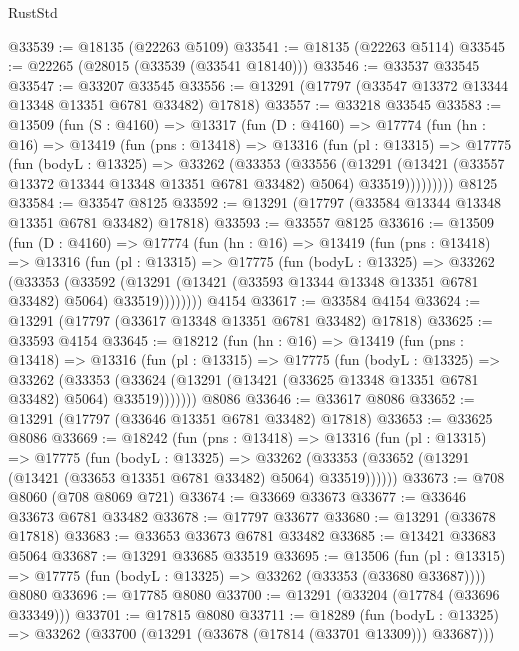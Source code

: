 \begin{lexlean}{RustStd}
\begin{coremodule}
@33539 := @18135 (@22263 @5109)
@33541 := @18135 (@22263 @5114)
@33545 := @22265 (@28015 (@33539 (@33541 @18140)))
@33546 := @33537 @33545
@33547 := @33207 @33545
@33556 := @13291 (@17797 (@33547 @13372 @13344 @13348 @13351 @6781 @33482) @17818)
@33557 := @33218 @33545
@33583 := @13509
    (fun (S : @4160) =>
    @13317
      (fun (D : @4160) =>
      @17774
        (fun (hn : @16) =>
        @13419
          (fun (pns : @13418) =>
          @13316
            (fun (pl : @13315) =>
            @17775
              (fun (bodyL : @13325) =>
              @33262
                (@33353
                  (@33556
                    (@13291
                      (@13421 (@33557 @13372 @13344 @13348 @13351 @6781 @33482) @5064)
                      @33519)))))))))
    @8125
@33584 := @33547 @8125
@33592 := @13291 (@17797 (@33584 @13344 @13348 @13351 @6781 @33482) @17818)
@33593 := @33557 @8125
@33616 := @13509
    (fun (D : @4160) =>
    @17774
      (fun (hn : @16) =>
      @13419
        (fun (pns : @13418) =>
        @13316
          (fun (pl : @13315) =>
          @17775
            (fun (bodyL : @13325) =>
            @33262
              (@33353
                (@33592
                  (@13291 (@13421 (@33593 @13344 @13348 @13351 @6781 @33482) @5064) @33519))))))))
    @4154
@33617 := @33584 @4154
@33624 := @13291 (@17797 (@33617 @13348 @13351 @6781 @33482) @17818)
@33625 := @33593 @4154
@33645 := @18212
    (fun (hn : @16) =>
    @13419
      (fun (pns : @13418) =>
      @13316
        (fun (pl : @13315) =>
        @17775
          (fun (bodyL : @13325) =>
          @33262
            (@33353 (@33624 (@13291 (@13421 (@33625 @13348 @13351 @6781 @33482) @5064) @33519)))))))
    @8086
@33646 := @33617 @8086
@33652 := @13291 (@17797 (@33646 @13351 @6781 @33482) @17818)
@33653 := @33625 @8086
@33669 := @18242
    (fun (pns : @13418) =>
    @13316
      (fun (pl : @13315) =>
      @17775
        (fun (bodyL : @13325) =>
        @33262 (@33353 (@33652 (@13291 (@13421 (@33653 @13351 @6781 @33482) @5064) @33519))))))
@33673 := @708 @8060 (@708 @8069 @721)
@33674 := @33669 @33673
@33677 := @33646 @33673 @6781 @33482
@33678 := @17797 @33677
@33680 := @13291 (@33678 @17818)
@33683 := @33653 @33673 @6781 @33482
@33685 := @13421 @33683 @5064
@33687 := @13291 @33685 @33519
@33695 := @13506
    (fun (pl : @13315) => @17775 (fun (bodyL : @13325) => @33262 (@33353 (@33680 @33687))))
    @8080
@33696 := @17785 @8080
@33700 := @13291 (@33204 (@17784 (@33696 @33349)))
@33701 := @17815 @8080
@33711 := @18289
    (fun (bodyL : @13325) => @33262 (@33700 (@13291 (@33678 (@17814 (@33701 @13309))) @33687)))

\end{coremodule}
\end{lexlean}
